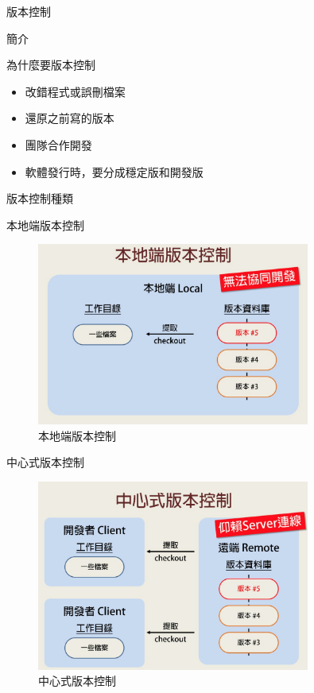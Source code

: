 \documentclass[pdf,16pt]{beamer}
\begin{document}
  \begin{section}{版本控制}
    \begin{subsection}{簡介}
      \begin{frame}{為什麼要版本控制}
        \begin{itemize}
          \item 改錯程式或誤刪檔案
          \item 還原之前寫的版本
          \item 團隊合作開發
          \item 軟體發行時，要分成穩定版和開發版
        \end{itemize}
      \end{frame}
    \end{subsection}
    
    \begin{subsection}{版本控制種類}
      \begin{frame}{本地端版本控制}
        \begin{figure}[h!]
          \includegraphics[width=0.8\textwidth]{images/001.jpg} 
          \caption{本地端版本控制}
        \end{figure}
      \end{frame}
      
      \begin{frame}{中心式版本控制}
        \begin{figure}[h!]
          \includegraphics[width=0.8\textwidth]{images/002.jpg} 
          \caption{中心式版本控制}
        \end{figure}
      \end{frame}
      

\end{subsection}
\end{section}
\end{document}
